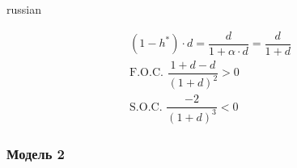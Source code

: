 \documentclass{article}
\begin{document}
\begin{otherlanguage*}{russian}
\begin{enumerate}
\begin{align*}
(1 - h ^* ) \cdot d = \dfrac{d}{1 + \alpha \cdot d } = \dfrac{d}{1 + d}\\
\text{F.O.C. } \dfrac{1 + d - d }{(1 + d) ^ 2 } > 0 \\
\text{S.O.C. } \dfrac{-2}{(1 + d)^3} < 0 
\end{align*}
\end{enumerate}
\subsubsection*{Модель 2}

\end{otherlanguage*} 
\end{document}
